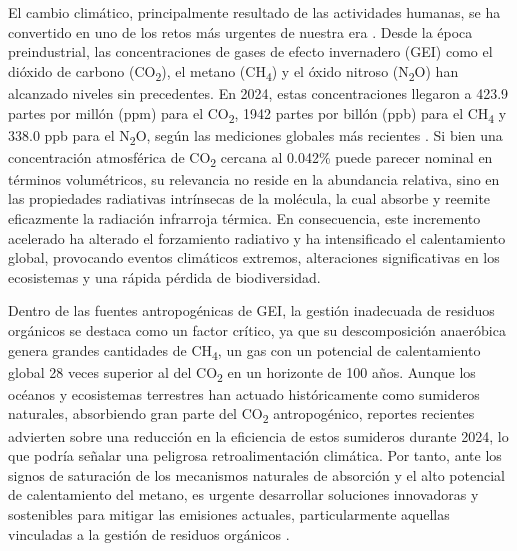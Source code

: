 El cambio climático, principalmente resultado de las actividades humanas, se ha convertido en uno de los retos más urgentes de nuestra era \parencite{allanSummaryPolicymakers2023}. Desde la época preindustrial, las concentraciones de gases de efecto invernadero (GEI) como el dióxido de carbono (CO\textsubscript{2}), el metano (CH\textsubscript{4}) y el óxido nitroso (N\textsubscript{2}O) han alcanzado niveles sin precedentes. En 2024, estas concentraciones llegaron a 423.9 partes por millón (ppm) para el CO\textsubscript{2}, 1942 partes por billón (ppb) para el CH\textsubscript{4} y 338.0 ppb para el N\textsubscript{2}O, según las mediciones globales más recientes \parencite{ak-bhdWEATHERCLIMATEWATER}. Si bien una concentración atmosférica de CO\textsubscript{2} cercana al 0.042\% puede parecer nominal en términos volumétricos, su relevancia no reside en la abundancia relativa, sino en las propiedades radiativas intrínsecas de la molécula, la cual absorbe y reemite eficazmente la radiación infrarroja térmica. En consecuencia, este incremento acelerado ha alterado el forzamiento radiativo y ha intensificado el calentamiento global, provocando eventos climáticos extremos, alteraciones significativas en los ecosistemas y una rápida pérdida de biodiversidad. 

Dentro de las fuentes antropogénicas de GEI, la gestión inadecuada de residuos orgánicos se destaca como un factor crítico, ya que su descomposición anaeróbica genera grandes cantidades de CH\textsubscript{4}, un gas con un potencial de calentamiento global 28 veces superior al del CO\textsubscript{2} en un horizonte de 100 años. Aunque los océanos y ecosistemas terrestres han actuado históricamente como sumideros naturales, absorbiendo gran parte del CO\textsubscript{2} antropogénico, reportes recientes advierten sobre una reducción en la eficiencia de estos sumideros durante 2024, lo que podría señalar una peligrosa retroalimentación climática. Por tanto, ante los signos de saturación de los mecanismos naturales de absorción y el alto potencial de calentamiento del metano, es urgente desarrollar soluciones innovadoras y sostenibles para mitigar las emisiones actuales, particularmente aquellas vinculadas a la gestión de residuos orgánicos \parencite{oecdFoodLossWaste2025}.

